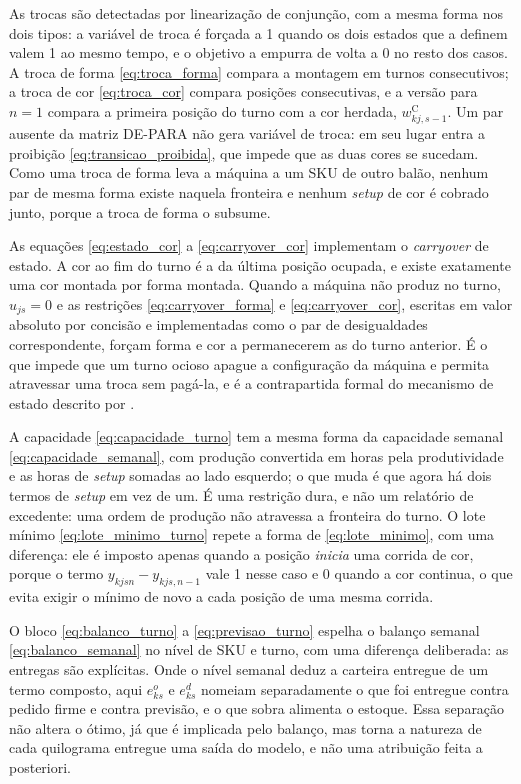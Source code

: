 \documentclass[fleqn,12pt,a4paper]{article}
\begin{document}
As trocas são detectadas por linearização de conjunção, com a mesma forma nos dois tipos: a variável de troca é forçada a 1 quando os dois estados que a definem valem 1 ao mesmo tempo, e o objetivo a empurra de volta a 0 no resto dos casos. A troca de forma \eqref{eq:troca_forma} compara a montagem em turnos consecutivos; a troca de cor \eqref{eq:troca_cor} compara posições consecutivas, e a versão para $n = 1$ compara a primeira posição do turno com a cor herdada, $w^{\mathrm{C}}_{kj,s-1}$. Um par ausente da matriz DE-PARA não gera variável de troca: em seu lugar entra a proibição \eqref{eq:transicao_proibida}, que impede que as duas cores se sucedam. Como uma troca de forma leva a máquina a um SKU de outro balão, nenhum par de mesma forma existe naquela fronteira e nenhum \textit{setup} de cor é cobrado junto, porque a troca de forma o subsume.

As equações \eqref{eq:estado_cor} a \eqref{eq:carryover_cor} implementam o \textit{carryover} de estado. A cor ao fim do turno é a da última posição ocupada, e existe exatamente uma cor montada por forma montada. Quando a máquina não produz no turno, $u_{js} = 0$ e as restrições \eqref{eq:carryover_forma} e \eqref{eq:carryover_cor}, escritas em valor absoluto por concisão e implementadas como o par de desigualdades correspondente, forçam forma e cor a permanecerem as do turno anterior. É o que impede que um turno ocioso apague a configuração da máquina e permita atravessar uma troca sem pagá-la, e é a contrapartida formal do mecanismo de estado descrito por .

A capacidade \eqref{eq:capacidade_turno} tem a mesma forma da capacidade semanal \eqref{eq:capacidade_semanal}, com produção convertida em horas pela produtividade e as horas de \textit{setup} somadas ao lado esquerdo; o que muda é que agora há dois termos de \textit{setup} em vez de um. É uma restrição dura, e não um relatório de excedente: uma ordem de produção não atravessa a fronteira do turno. O lote mínimo \eqref{eq:lote_minimo_turno} repete a forma de \eqref{eq:lote_minimo}, com uma diferença: ele é imposto apenas quando a posição \emph{inicia} uma corrida de cor, porque o termo $y_{kjsn} - y_{kjs,n-1}$ vale 1 nesse caso e 0 quando a cor continua, o que evita exigir o mínimo de novo a cada posição de uma mesma corrida.

O bloco \eqref{eq:balanco_turno} a \eqref{eq:previsao_turno} espelha o balanço semanal \eqref{eq:balanco_semanal} no nível de SKU e turno, com uma diferença deliberada: as entregas são explícitas. Onde o nível semanal deduz a carteira entregue de um termo composto, aqui $e^{o}_{ks}$ e $e^{d}_{ks}$ nomeiam separadamente o que foi entregue contra pedido firme e contra previsão, e o que sobra alimenta o estoque. Essa separação não altera o ótimo, já que é implicada pelo balanço, mas torna a natureza de cada quilograma entregue uma saída do modelo, e não uma atribuição feita a posteriori.
\end{document}
